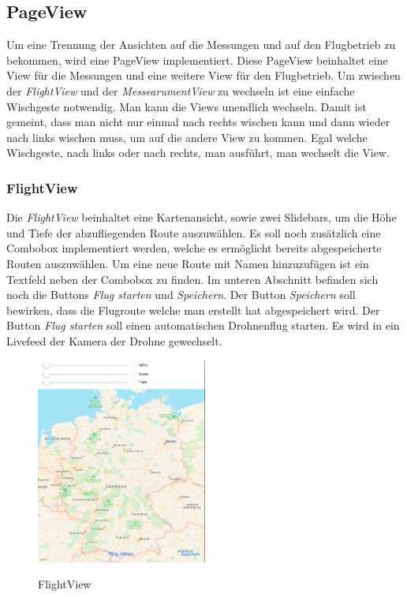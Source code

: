 \subsection{PageView}
Um eine Trennung der Ansichten auf die Messungen und auf den Flugbetrieb zu bekommen, wird eine PageView implementiert. Diese PageView beinhaltet eine View für die Messungen und eine weitere View für den Flugbetrieb. 
\newline
Um zwischen der \textit{FlightView} und der \textit{MessearumentView} zu wechseln ist eine einfache Wischgeste notwendig. Man kann die Views unendlich wechseln. Damit ist gemeint, dass man nicht nur einmal nach rechts wischen kann und dann wieder nach links wischen muss, um auf die andere View zu kommen. Egal welche Wischgeste, nach links oder nach rechts, man ausführt, man wechselt die View.
\subsubsection{FlightView}
Die \textit{FlightView} beinhaltet eine Kartenansicht, sowie zwei Slidebars, um die Höhe und Tiefe der abzufliegenden Route auszuwählen. Es soll noch zusätzlich eine Combobox implementiert werden, welche es ermöglicht bereits abgespeicherte Routen auszuwählen. Um eine neue Route mit Namen hinzuzufügen ist ein Textfeld neben der Combobox zu finden. Im unteren Abschnitt befinden sich noch die Buttons \textit{Flug starten} und \textit{Speichern}. 
\newline
Der Button \textit{Speichern} soll bewirken, dass die Flugroute welche man erstellt hat abgespeichert wird. Der Button \textit{Flug starten} soll einen automatischen Drohnenflug starten. Es wird in ein Livefeed der Kamera der Drohne gewechselt. 
\newline
\begin{figure}[H]
	\begin{center}
		{\includegraphics[width=0.5\textwidth]{images/FlightView.png}}
		\caption{FlightView}
	\end{center}
\end{figure}
